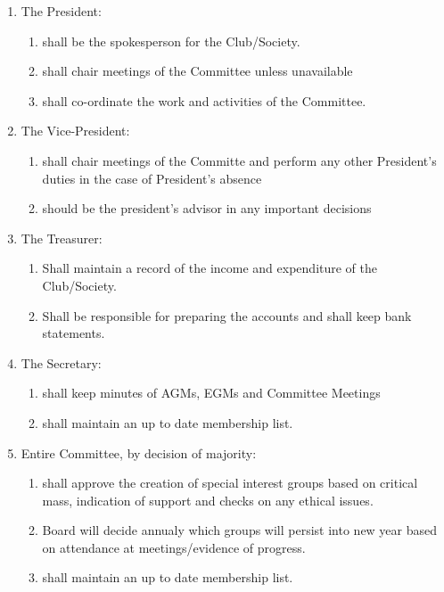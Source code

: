 \documentclass{report}
\begin{document}
	\begin{enumerate}
		\item{The President:
			\begin{enumerate}
				\item{shall be the spokesperson for the Club/Society.}
				\item{shall chair meetings of the Committee unless unavailable }
				\item{shall co-ordinate the work and activities of the Committee.}
			\end{enumerate}
		}
		\item{The Vice-President:
			\begin{enumerate}
				\item{shall chair meetings of the Committe and perform any other President’s duties in the case of President's absence}
				\item{should be the president's advisor in any important decisions}
			\end{enumerate}
		}
		\item{The Treasurer:
			\begin{enumerate}
				\item{Shall maintain a record of the income and expenditure of the Club/Society.}
				\item{Shall be responsible for preparing the accounts and shall keep bank statements.}
			\end{enumerate}
		}
		\item{The Secretary:
			\begin{enumerate}
				\item{shall keep minutes of AGMs, EGMs and Committee Meetings}
				\item{shall maintain an up to date membership list.}
			\end{enumerate}
		}
		\item{Entire Committee, by decision of majority:
			\begin{enumerate}
				\item{shall approve the creation of special interest groups based on critical mass, indication of support and checks on any ethical issues.}
				\item{Board will decide annualy which groups will persist into new year based on attendance at meetings/evidence of progress.}
				\item{shall maintain an up to date membership list.}
			\end{enumerate}
		}
	\end{enumerate}
\end{document}

